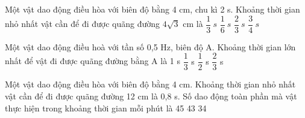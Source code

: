\begin{vidu}%
Một vật dao động điều hòa với biên độ bằng 4 cm, chu kì 2 s. Khoảng thời gian nhỏ nhất vật cần để đi được quãng đường  $4\sqrt{3}$  cm là
\choice
{$\dfrac{1}{3}\ s$}
{$\dfrac{1}{6}\ s$}
{\True $\dfrac{2}{3}\ s$}
{$\dfrac{3}{4}\ s$}
\end{vidu} %
\begin{vidu}%
Một vật dao động điều hoà với tần số 0,5 Hz, biên độ A. Khoảng thời gian lớn nhất để vật đi được quãng đường bằng A là
\choice
{1 s}
{$\dfrac{1}{3}$ s}
{$\dfrac{1}{2}$ s}
{\True $\dfrac{2}{3}$ s}
\end{vidu} %
\begin{vidu}%
Một vật dao động điều hòa với biên độ bằng 4 cm. Khoảng thời gian nhỏ nhất vật cần để đi được quãng đường 12 cm là 0,8 s. Số dao động toàn phần mà vật thực hiện trong khoảng thời gian mỗi phút là
\choice
{45}
{43}
{34}
{}

\end{vidu} %
